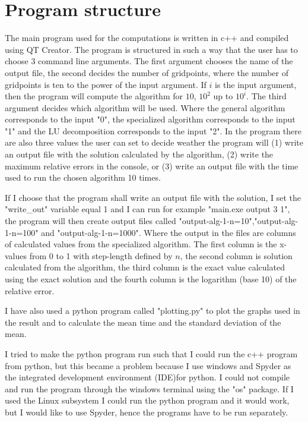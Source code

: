 \documentclass[12pt]{article}
\begin{document}
\section{Program structure}
The main program used for the computations is written in c++ and compiled using QT Creator. The program is structured in such a way that the user has to choose 3 command line arguments. The first argument chooses the name of the output file, the second decides the number of gridpoints, where the number of gridpoints is ten to the power of the input argument. If $i$ is the input argument, then the program will compute the algorithm for $10$, $10^2$ up to $10^i$. The third argument decides which algorithm will be used. Where the general algorithm corresponds to the input "0", the specialized algorithm corresponds to the input "1" and the LU decomposition corresponds to the input "2". In the program there are also three values the user can set to decide weather the program will (1) write an output file with the solution calculated by the algorithm, (2) write the maximum relative errors in the console, or (3) write an output file with the time used to run the chosen algorithm 10 times. 

If I choose that the program shall write an output file with the solution, I set the "write\_out" variable equal 1 and I can run for example "main.exe output 3 1", the program will then create output files called "output-alg-1-n=10","output-alg-1-n=100" and "output-alg-1-n=1000". Where the output in the files are columns of calculated values from the specialized algorithm. The first column is the x-values from 0 to 1 with step-length defined by $n$, the second column is solution calculated from the algorithm, the third column is the exact value calculated using the exact solution and the fourth column is the logarithm (base 10) of the relative error. 

I have also used a python program called "plotting.py" to plot the graphs used in the result and to calculate the mean time and the standard deviation of the mean.

I tried to make the python program run such that I could run the c++ program from python, but this became a problem because I use windows and Spyder as the integrated development environment (IDE)for python. I could not compile and run the program through the windows terminal using the "os" package. If I used the Linux subsystem I could run the python program and it would work, but I would like to use Spyder, hence the programs have to be run separately. 
\end{document}

